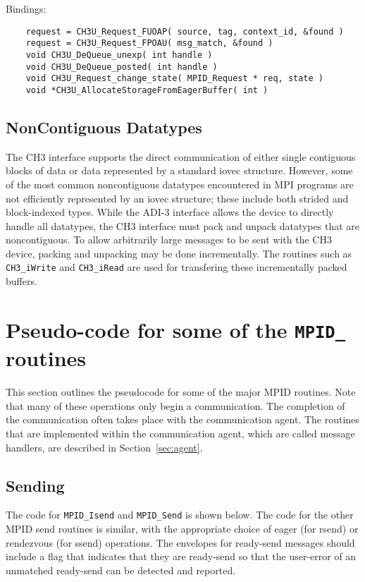 \documentclass{article}
\def\code{\begingroup\makeustext\eatcode}
\def\eatcode#1{\texttt{#1}\endgroup}
\begin{document}
Bindings:
\begin{verbatim}
    request = CH3U_Request_FUOAP( source, tag, context_id, &found )
    request = CH3U_Request_FPOAU( msg_match, &found )
    void CH3U_DeQueue_unexp( int handle )
    void CH3U_DeQueue_posted( int handle )
    void CH3U_Request_change_state( MPID_Request * req, state )
    void *CH3U_AllocateStorageFromEagerBuffer( int )
\end{verbatim}

\subsection{NonContiguous Datatypes}
The CH3 interface supports the direct communication of either single
contiguous blocks of data or data represented by a standard iovec
structure.  However, some of the most common noncontiguous datatypes
encountered in MPI programs are not efficiently represented by an
iovec structure; these include both strided and block-indexed types.
While the ADI-3 interface allows the device to directly handle all
datatypes, the CH3 interface must pack and unpack datatypes that are
noncontiguous.  To allow arbitrarily large messages to be sent with
the CH3 device, packing and unpacking may be done incrementally.  The
routines such as \code{CH3\_iWrite} and \code{CH3\_iRead} are used for
transfering these incrementally packed buffers.

\section{Pseudo-code for some of the \code{MPID\_} routines}
This section outlines the pseudocode for some of the major MPID
routines.
Note that many of these operations only begin a communication.  The
completion of the communication often takes place with the
communication agent.  The routines that are implemented within the
communication agent, which are called message handlers, are described
in Section~\ref{sec:agent}.

\subsection{Sending}
The code for \code{MPID_Isend} and \code{MPID_Send} is shown below.  The code
for the other 
MPID send routines is similar, with the appropriate choice of eager
(for rsend) or rendezvous (for ssend) operations.  
The envelopes for ready-send messages should include
a flag that indicates that they are ready-send so that the user-error of an
unmatched ready-send can be detected and reported.
\end{document}

